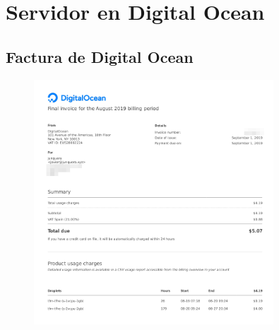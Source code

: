 \chapter{Servidor en Digital Ocean}
\label{appendix:server-do}

\section{Factura de Digital Ocean}

\begin{figure}[h]
    \centering 
    \includegraphics[width=0.8\textwidth]{apendices/invoice-do.png}
\end{figure}
 
